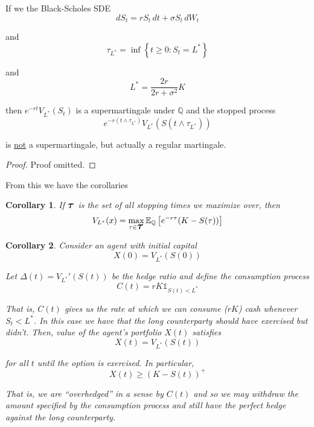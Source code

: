 \documentclass[12pt]{article}
\newenvironment{theorem}[2][Theorem:]{\begin{trivlist} %
\item[\hskip \labelsep {\bfseries #1}\hskip \labelsep {\bfseries #2.}]}{\end{trivlist}}
\newtheorem{corollary}{Corollary}
\newlength\tindent
\renewcommand{\indent}{\hspace*{\tindent}}
\newcommand{\Q}{\mathbb Q}
\newcommand{\E}{\mathbb E}
\newcommand{\bigtau}{\text{{\large $\bm \tau$}}}
\begin{document}
\begin{theorem}{some name...} If we the Black-Scholes SDE
\begin{equation*}
	dS_t = rS_t\,dt + \sigma S_t\,dW_t
\end{equation*}

and
\begin{equation*}
	\tau_{L^*} = \inf \left\{ t \geq 0: S_t = L^* \right\}
\end{equation*}

and
\begin{equation*}
	L^* = \frac{2r}{2r + \sigma^2}K
\end{equation*}

then $e^{-rt}V_{L^*}(S_t)$ is a supermartingale under $\Q$ and the stopped process
\begin{equation*}
	e^{-r (t\land\tau_{L^*})} V_{L^*}(S(t\land\tau_{L^*}))
\end{equation*}

is \underline{not} a supermartingale, but actually a regular martingale.
\begin{proof} Proof omitted.
\end{proof}
\end{theorem}

From this we have the corollaries
\begin{corollary} If $\bigtau$ is the set of all stopping times we maximize over, then
\begin{equation*}
	V_{L^*}(x) = \max_{\tau \in \bigtau} \E_\Q \left[ e^{-r\tau} (K - S(\tau)) \right]
\end{equation*}
\end{corollary}

\begin{corollary} Consider an agent with initial capital
\begin{equation*}
	X(0) = V_{L^*}(S(0))
\end{equation*}

Let $\Delta(t) = V_{L^*}'(S(t))$ be the hedge ratio and define the consumption process
\begin{equation*}
	C(t) = rK \mathds 1_{S(t) < L^*}
\end{equation*}

\indent That is, $C(t)$ gives us the rate at which we can consume ($rK$) cash whenever $S_t < L^*$. In this case we have that the long counterparty should have exercised but didn't. Then, value of the agent's portfolio $X(t)$ satisfies
\begin{equation*}
	X(t) = V_{L^*}(S(t))
\end{equation*}

for all $t$ until the option is exercised. In particular,
\begin{equation*}
	X(t) \geq (K - S(t))^+
\end{equation*}

\indent That is, we are ``overhedged'' in a sense by $C(t)$ and so we may withdraw the amount specified by the consumption process and still have the perfect hedge against the long counterparty.
\end{corollary}
\end{document}
